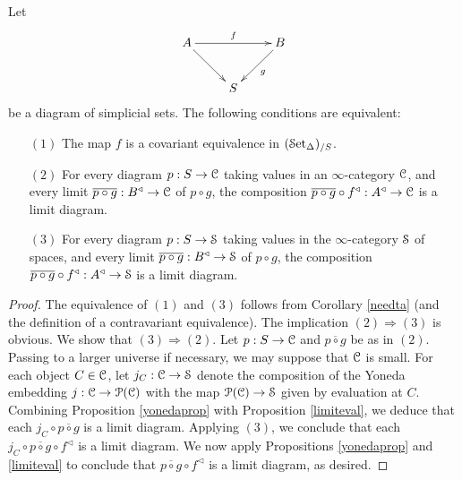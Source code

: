 \begin{lemma}\label{natee}
Let $$\xymatrix{ A \ar[rr]^{f} \ar[dr] & & B \ar[dl]^{g} \\
& S & }$$
be a diagram of simplicial sets. The following conditions are equivalent:

\begin{itemize}
\item[$(1)$] The map $f$ is a covariant equivalence in $(\operatorname{\mathcal{S}et_{\Delta}})_{/S}$.

\item[$(2)$] For every diagram $p: S \rightarrow \operatorname{\mathcal{C}}$ taking values in an $\infty$-category $\operatorname{\mathcal{C}}$, and every limit $\overline{p \circ g}: B^{\triangleleft} \rightarrow \operatorname{\mathcal{C}}$ of
$p \circ g$, the composition $\overline{p \circ g} \circ f^{\triangleleft}: A^{\triangleleft} \rightarrow \operatorname{\mathcal{C}}$ is a limit diagram.

\item[$(3)$] For every diagram $p: S \rightarrow \operatorname{\mathcal{S}}$ taking values in the $\infty$-category
$\operatorname{\mathcal{S}}$ of spaces, and every limit $\overline{p \circ g}: B^{\triangleleft} \rightarrow \operatorname{\mathcal{S}}$ of
$p \circ g$, the composition $\overline{p \circ g} \circ f^{\triangleleft}: A^{\triangleleft} \rightarrow \operatorname{\mathcal{S}}$ is a limit diagram.
\end{itemize}
\end{lemma}

\begin{proof}
The equivalence of $(1)$ and $(3)$ follows from Corollary \ref{needta} (and the definition of a contravariant equivalence). The implication $(2) \Rightarrow (3)$ is obvious. We show that $(3) \Rightarrow (2)$. Let $p: S \rightarrow \operatorname{\mathcal{C}}$ and $\overline{p \circ g}$ be as in $(2)$. 
Passing to a larger universe if necessary, we may suppose that $\operatorname{\mathcal{C}}$ is small.
For each object $C \in \operatorname{\mathcal{C}}$, let $j_C: \operatorname{\mathcal{C}} \rightarrow \operatorname{\mathcal{S}}$ denote the composition of the Yoneda embedding $j: \operatorname{\mathcal{C}} \rightarrow \operatorname{\mathcal{P}}(\operatorname{\mathcal{C}})$ with the map $\operatorname{\mathcal{P}}(\operatorname{\mathcal{C}}) \rightarrow \operatorname{\mathcal{S}}$ given by evaluation at $C$. Combining Proposition \ref{yonedaprop} with Proposition \ref{limiteval}, we deduce that each $j_{C} \circ \overline{p \circ g}$ is a limit diagram. Applying $(3)$, we conclude that each $j_{C} \circ \overline{p \circ g} \circ f^{\triangleleft}$ is a limit diagram. We now apply Propositions \ref{yonedaprop} and \ref{limiteval} to conclude that $\overline{p \circ g} \circ f^{\triangleleft}$ is a limit diagram, as desired.
\end{proof}

